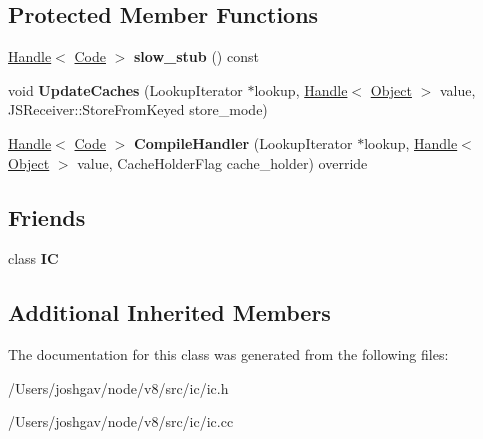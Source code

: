 \subsection*{Protected Member Functions}
\begin{DoxyCompactItemize}
\item 
\hyperlink{classv8_1_1internal_1_1_handle}{Handle}$<$ \hyperlink{classv8_1_1internal_1_1_code}{Code} $>$ {\bfseries slow\+\_\+stub} () const \hypertarget{classv8_1_1internal_1_1_store_i_c_ad42ef56eef93492afa83e97aa2772fd8}{}\label{classv8_1_1internal_1_1_store_i_c_ad42ef56eef93492afa83e97aa2772fd8}

\item 
void {\bfseries Update\+Caches} (Lookup\+Iterator $\ast$lookup, \hyperlink{classv8_1_1internal_1_1_handle}{Handle}$<$ \hyperlink{classv8_1_1internal_1_1_object}{Object} $>$ value, J\+S\+Receiver\+::\+Store\+From\+Keyed store\+\_\+mode)\hypertarget{classv8_1_1internal_1_1_store_i_c_a3963b8c5ebe005242db43b51200d5fbf}{}\label{classv8_1_1internal_1_1_store_i_c_a3963b8c5ebe005242db43b51200d5fbf}

\item 
\hyperlink{classv8_1_1internal_1_1_handle}{Handle}$<$ \hyperlink{classv8_1_1internal_1_1_code}{Code} $>$ {\bfseries Compile\+Handler} (Lookup\+Iterator $\ast$lookup, \hyperlink{classv8_1_1internal_1_1_handle}{Handle}$<$ \hyperlink{classv8_1_1internal_1_1_object}{Object} $>$ value, Cache\+Holder\+Flag cache\+\_\+holder) override\hypertarget{classv8_1_1internal_1_1_store_i_c_a4600ff8e61b185b185d05ba90a28a5b1}{}\label{classv8_1_1internal_1_1_store_i_c_a4600ff8e61b185b185d05ba90a28a5b1}

\end{DoxyCompactItemize}
\subsection*{Friends}
\begin{DoxyCompactItemize}
\item 
class {\bfseries IC}\hypertarget{classv8_1_1internal_1_1_store_i_c_ae59e849648858af1fd22081890d47b78}{}\label{classv8_1_1internal_1_1_store_i_c_ae59e849648858af1fd22081890d47b78}

\end{DoxyCompactItemize}
\subsection*{Additional Inherited Members}


The documentation for this class was generated from the following files\+:\begin{DoxyCompactItemize}
\item 
/\+Users/joshgav/node/v8/src/ic/ic.\+h\item 
/\+Users/joshgav/node/v8/src/ic/ic.\+cc\end{DoxyCompactItemize}
